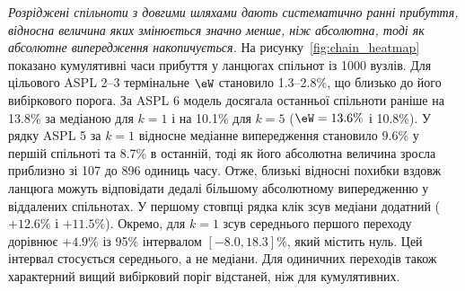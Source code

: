 \emph{Розріджені спільноти з довгими шляхами дають систематично ранні прибуття, відносна величина яких змінюється значно менше, ніж абсолютна, тоді як абсолютне випередження накопичується.} На рисунку~\ref{fig:chain_heatmap} показано кумулятивні часи прибуття у ланцюгах спільнот із 1000 вузлів. Для цільового ASPL 2--3 термінальне $\eW$ становило 1.3--2.8\%, що близько до його вибіркового порога. За ASPL 6 модель \TS{} досягала останньої спільноти раніше на 13.8\% за медіаною для $k=1$ і на 10.1\% для $k=5$ ($\eW=13.6\%$ і 10.8\%). У рядку ASPL 5 за $k=1$ відносне медіанне випередження становило 9.6\% у першій спільноті та 8.7\% в останній, тоді як його абсолютна величина зросла приблизно зі 107 до 896 одиниць часу. Отже, близькі відносні похибки вздовж ланцюга можуть відповідати дедалі більшому абсолютному випередженню у віддалених спільнотах. У першому стовпці рядка клік зсув медіани додатний ($+12.6\%$ і $+11.5\%$). Окремо, для $k=1$ зсув середнього першого переходу дорівнює $+4.9\%$ із 95\% інтервалом $[-8.0,18.3]\%$, який містить нуль. Цей інтервал стосується середнього, а не медіани. Для одиничних переходів також характерний вищий вибірковий поріг відстаней, ніж для кумулятивних.

